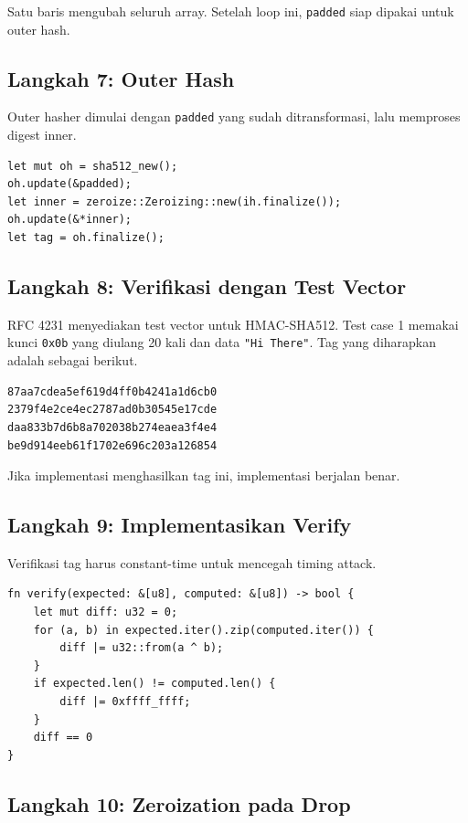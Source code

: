 \documentclass[11pt,a4paper]{article}
\begin{document}
Satu baris mengubah seluruh array. Setelah loop ini, \texttt{padded} siap dipakai untuk outer hash.

\subsection{Langkah 7: Outer Hash}

Outer hasher dimulai dengan \texttt{padded} yang sudah ditransformasi, lalu memproses digest inner.

\begin{lstlisting}[style=code]
let mut oh = sha512_new();
oh.update(&padded);
let inner = zeroize::Zeroizing::new(ih.finalize());
oh.update(&*inner);
let tag = oh.finalize();
\end{lstlisting}

\subsection{Langkah 8: Verifikasi dengan Test Vector}

RFC 4231 menyediakan test vector untuk HMAC-SHA512. Test case 1 memakai kunci \texttt{0x0b} yang diulang 20 kali dan data \texttt{"Hi There"}. Tag yang diharapkan adalah sebagai berikut.

\begin{lstlisting}[style=out]
87aa7cdea5ef619d4ff0b4241a1d6cb0
2379f4e2ce4ec2787ad0b30545e17cde
daa833b7d6b8a702038b274eaea3f4e4
be9d914eeb61f1702e696c203a126854
\end{lstlisting}

Jika implementasi menghasilkan tag ini, implementasi berjalan benar.

\subsection{Langkah 9: Implementasikan Verify}

Verifikasi tag harus constant-time untuk mencegah timing attack.

\begin{lstlisting}[style=code]
fn verify(expected: &[u8], computed: &[u8]) -> bool {
    let mut diff: u32 = 0;
    for (a, b) in expected.iter().zip(computed.iter()) {
        diff |= u32::from(a ^ b);
    }
    if expected.len() != computed.len() {
        diff |= 0xffff_ffff;
    }
    diff == 0
}
\end{lstlisting}

\subsection{Langkah 10: Zeroization pada Drop}
\end{document}
